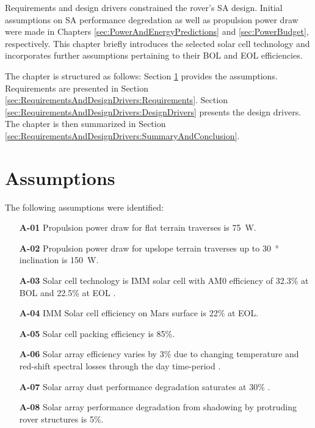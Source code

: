 Requirements and design drivers constrained the rover's \ac{SA} design. Initial assumptions on \ac{SA} performance degredation as well as propulsion power draw were made in Chapters \ref{sec:PowerAndEnergyPredictions} and \ref{sec:PowerBudget}, respectively. This chapter briefly introduces the selected solar cell technology and incorporates further assumptions pertaining to their \ac{BOL} and \ac{EOL} efficiencies.

The chapter is structured as follows: Section \ref{sec:RequirementsAndDesignDrivers:Assumptions} provides the assumptions. Requirements are presented in Section \ref{sec:RequirementsAndDesignDrivers:Requirements}. Section  \ref{sec:RequirementsAndDesignDrivers:DesignDrivers} presents the design drivers. The chapter is then summarized in Section \ref{sec:RequirementsAndDesignDrivers:SummaryAndConclusion}.


\section{Assumptions}
\label{sec:RequirementsAndDesignDrivers:Assumptions}
The following assumptions were identified:

\begin{itemize}
    \item[\textbf{A-01}] Propulsion power draw for flat terrain traverses is \SI{75}{\watt}.
    \item[\textbf{A-02}] Propulsion power draw for upslope terrain traverses up to \SI{30}{\degree} inclination is \SI{150}{\watt}.
    \item[\textbf{A-03}] Solar cell technology is \ac{IMM} solar cell with AM0 efficiency of 32.3\% at \ac{BOL} and 22.5\% at \ac{EOL} .
    \item[\textbf{A-04}] IMM Solar cell efficiency on Mars surface is 22\% at \ac{EOL}.
    \item[\textbf{A-05}] Solar cell packing efficiency is 85\%.
    \item[\textbf{A-06}] Solar array efficiency varies by 3\% due to changing temperature and red-shift spectral losses through the day time-period .
    \item[\textbf{A-07}] Solar array dust performance degradation saturates at 30\% .
    \item[\textbf{A-08}] Solar array performance degradation from shadowing by protruding rover structures is 5\%.
\end{itemize}

